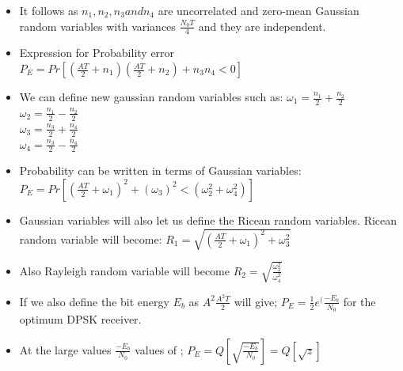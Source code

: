 \documentclass{beamer}
\begin{document}
\begin{frame}
	\begin{itemize}
		\item It follows as $n_1, n_2, n_3 and n_4$ are uncorrelated and zero-mean Gaussian random variables with variances $\frac{N_0 T}{4}$ and they are independent.
		\item Expression for Probability error $P_E= Pr [(\frac{A T}{2}+n_1)(\frac{A T}{2}+n_2)+n_3 n_4<0]$
		\item We can define new gaussian random variables  such as:
		$ \omega_1=\frac{n_1}{2}+\frac{n_2}{2} $ \\
		$ \omega_2=\frac{n_1}{2}-\frac{n_2}{2}  $\\
		$ \omega_3=\frac{n_3}{2}+\frac{n_4}{2}$ \\
		$ \omega_4=\frac{n_3}{2}-\frac{n_4}{2} $
	\end{itemize}
\end{frame}

\begin{frame}
	\begin{itemize}
		\item Probability can be written in terms of Gaussian variables:
		$P_E= Pr [(\frac{A T}{2}+\omega_1)^2 +(\omega_3)^2<(\omega_2^2+\omega_4^2)]$
		\item Gaussian variables will also let us define the Ricean random variables. Ricean random variable will become: $R_1=\sqrt{(\frac{AT}{2}+\omega_1)^2+\omega_3^2}$
		\item Also Rayleigh random variable will become $R_2=\sqrt{\frac{\omega_2^2}{\omega_4^2}}$
		\item If we also define the bit energy $E_b$ as $A^2 \frac{A^2 T}{2}$ will give;
		$P_E=\frac{1}{2} e^(\frac{-E_b}{N_0}$ for the optimum DPSK receiver.
		\item At the large values  $\frac{-E_b}{N_0}$ values of ;
		$P_E=Q[\sqrt{\frac{-E_b}{N_0}}]=Q[\sqrt{z}]$
	\end{itemize}
\end{frame}
\end{document}
